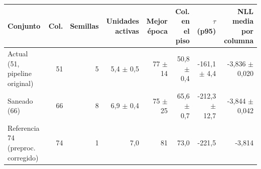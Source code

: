 \begin{tabular}{@{}lrrrrrrr@{}}
\toprule
Conjunto & Col. & Semillas & Unidades activas & Mejor época & Col. en el piso & $\tau$ (p95) & NLL media por columna \\
\midrule
Actual (51, pipeline original) & 51 & 5 & 5{,}4 $\pm$ 0{,}5 & 77 $\pm$ 14 & 50{,}8 $\pm$ 0{,}4 & -161{,}1 $\pm$ 4{,}4 & -3{,}836 $\pm$ 0{,}020 \\
Saneado (66) & 66 & 8 & 6{,}9 $\pm$ 0{,}4 & 75 $\pm$ 25 & 65{,}6 $\pm$ 0{,}7 & -212{,}3 $\pm$ 12{,}7 & -3{,}844 $\pm$ 0{,}042 \\
Referencia 74 (preproc. corregido) & 74 & 1 & 7{,}0 & 81 & 73{,}0 & -221{,}5 & -3{,}814 \\
\bottomrule
\end{tabular}
